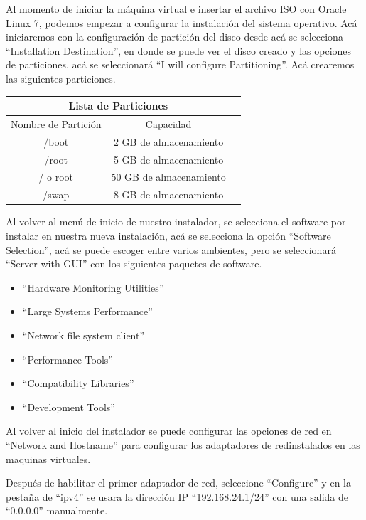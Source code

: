 \documentclass{article}
\begin{document}
Al momento de iniciar la máquina virtual e insertar el archivo ISO con Oracle Linux 7, podemos empezar a configurar la instalación del sistema operativo. Acá iniciaremos con la configuración de partición del disco desde acá se selecciona ``Installation Destination'', en donde se puede ver el disco creado y las opciones de particiones, acá se seleccionará ``I will configure Partitioning''. Acá crearemos las siguientes particiones.

\begin{center}
	\begin{tabular}{ |c|c|c| }
		\hline
		\multicolumn{2}{|c|}{Lista de Particiones}    \\
		\hline
		Nombre de Partición & Capacidad               \\
		\hline
		/boot               & 2 GB de almacenamiento  \\
		/root               & 5 GB de almacenamiento  \\
		/ o root            & 50 GB de almacenamiento \\
		/swap               & 8 GB de almacenamiento  \\
		\hline
	\end{tabular}
\end{center}

Al volver al menú de inicio de nuestro instalador, se selecciona el software por instalar en nuestra nueva instalación, acá se selecciona la opción ``Software Selection'', acá se puede escoger entre varios ambientes, pero se seleccionará ``Server with GUI'' con los siguientes paquetes de software.

\begin{itemize}
	\item ``Hardware Monitoring Utilities''
	\item ``Large Systems Performance''
	\item ``Network file system client''
	\item ``Performance Tools''
	\item ``Compatibility Libraries''
	\item ``Development Tools''
\end{itemize}

Al volver al inicio del instalador se puede configurar las opciones de red en ``Network and Hostname'' para configurar los adaptadores de redinstalados en las maquinas virtuales. 

Después de habilitar el primer adaptador de red, seleccione ``Configure'' y en la pestaña de ``ipv4'' se usara la dirección IP ``192.168.24.1/24'' con una salida de ``0.0.0.0''  manualmente.
\end{document}
